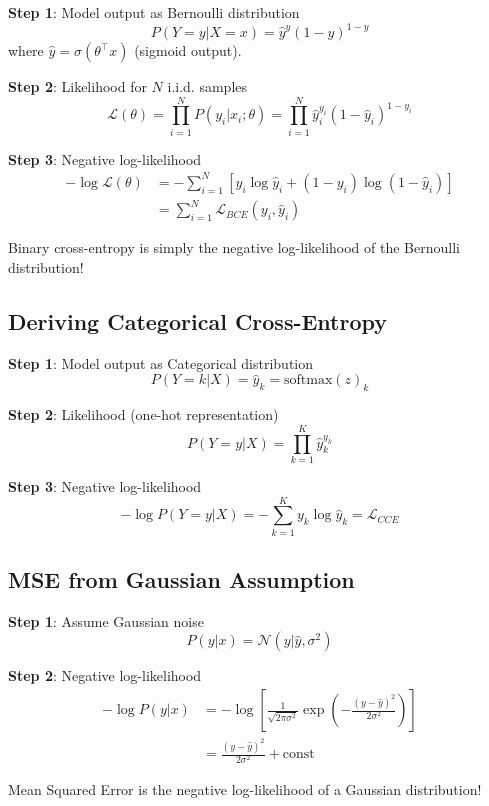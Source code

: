 \textbf{Step 1}: Model output as Bernoulli distribution
\[
P(Y = y | X = x) = \hat{y}^y (1 - \hat{y})^{1-y}
\]
where $\hat{y} = \sigma(\theta^\top x)$ (sigmoid output).

\textbf{Step 2}: Likelihood for $N$ i.i.d. samples
\[
\mathcal{L}(\theta) = \prod_{i=1}^{N} P(y_i | x_i; \theta) = \prod_{i=1}^{N} \hat{y}_i^{y_i}(1-\hat{y}_i)^{1-y_i}
\]

\textbf{Step 3}: Negative log-likelihood
\begin{align}
-\log \mathcal{L}(\theta) &= -\sum_{i=1}^{N} \left[ y_i \log \hat{y}_i + (1-y_i)\log(1-\hat{y}_i) \right] \\
&= \sum_{i=1}^{N} \mathcal{L}_{BCE}(y_i, \hat{y}_i)
\end{align}

\begin{important}
Binary cross-entropy is simply the negative log-likelihood of the Bernoulli distribution!
\end{important}

\subsection{Deriving Categorical Cross-Entropy}

\textbf{Step 1}: Model output as Categorical distribution
\[
P(Y = k | X) = \hat{y}_k = \text{softmax}(z)_k
\]

\textbf{Step 2}: Likelihood (one-hot representation)
\[
P(Y = y | X) = \prod_{k=1}^{K} \hat{y}_k^{y_k}
\]

\textbf{Step 3}: Negative log-likelihood
\[
-\log P(Y = y | X) = -\sum_{k=1}^{K} y_k \log \hat{y}_k = \mathcal{L}_{CCE}
\]

\subsection{MSE from Gaussian Assumption}

\textbf{Step 1}: Assume Gaussian noise
\[
P(y | x) = \mathcal{N}(y | \hat{y}, \sigma^2)
\]

\textbf{Step 2}: Negative log-likelihood
\begin{align}
-\log P(y | x) &= -\log\left[\frac{1}{\sqrt{2\pi\sigma^2}} \exp\left(-\frac{(y-\hat{y})^2}{2\sigma^2}\right)\right] \\
&= \frac{(y - \hat{y})^2}{2\sigma^2} + \text{const}
\end{align}

\begin{important}
Mean Squared Error is the negative log-likelihood of a Gaussian distribution!
\end{important}

